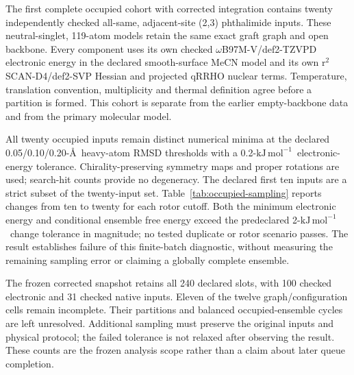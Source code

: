 \documentclass[11pt]{article}
\newcommand{\kj}{\ensuremath{\mathrm{kJ\,mol^{-1}}}}
\begin{document}
The first complete occupied cohort with corrected integration contains twenty independently checked all-same, adjacent-site (2,3) phthalimide inputs. These neutral-singlet, 119-atom models retain the same exact graft graph and open backbone. Every component uses its own checked $\omega$B97M-V/def2-TZVPD electronic energy in the declared smooth-surface MeCN model and its own r$^2$SCAN-D4/def2-SVP Hessian and projected qRRHO nuclear terms. Temperature, translation convention, multiplicity and thermal definition agree before a partition is formed. This cohort is separate from the earlier empty-backbone data and from the primary molecular model.

All twenty occupied inputs remain distinct numerical minima at the declared 0.05/0.10/0.20-\AA\ heavy-atom RMSD thresholds with a 0.2-\kj\ electronic-energy tolerance. Chirality-preserving symmetry maps and proper rotations are used; search-hit counts provide no degeneracy. The declared first ten inputs are a strict subset of the twenty-input set. Table~\ref{tab:occupied-sampling} reports changes from ten to twenty for each rotor cutoff. Both the minimum electronic energy and conditional ensemble free energy exceed the predeclared 2-\kj\ change tolerance in magnitude; no tested duplicate or rotor scenario passes. The result establishes failure of this finite-batch diagnostic, without measuring the remaining sampling error or claiming a globally complete ensemble.

\begin{table}[htbp]\centering\small
\caption{Corrected occupied phthalimide-control sampling diagnostic. Changes are twenty-input minus ten-input quantities in kJ/mol for the all-same, adjacent-site cell. The 0.10-\AA\ duplicate scenario is shown; 0.05 and 0.20 \AA\ give identical results. The predeclared tolerance is 2 kJ/mol for each metric. These deterministic sensitivities are not statistical intervals.}
\label{tab:occupied-sampling}

\end{table}

The frozen corrected snapshot retains all 240 declared slots, with 100 checked electronic and 31 checked native inputs. Eleven of the twelve graph/configuration cells remain incomplete. Their partitions and balanced occupied-ensemble cycles are left unresolved. Additional sampling must preserve the original inputs and physical protocol; the failed tolerance is not relaxed after observing the result. These counts are the frozen analysis scope rather than a claim about later queue completion.
\end{document}
